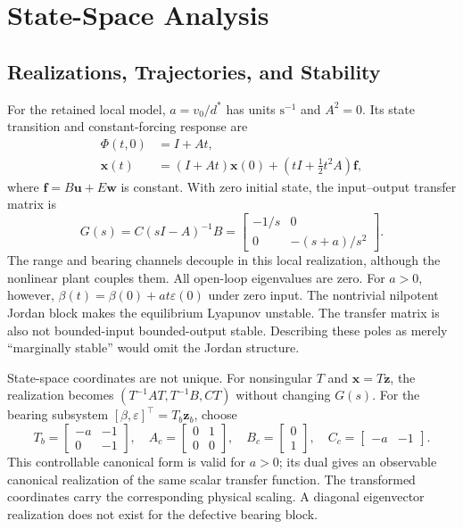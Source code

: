 \section{State-Space Analysis}
\label{sec:analysis}
\subsection{Realizations, Trajectories, and Stability}
For the retained local model, $a=v_0/d^\ast$ has units $\mathrm{s^{-1}}$ and $A^2=0$. Its state transition and constant-forcing response are
\begin{equation}
\begin{aligned}
\Phi(t,0)&=I+At,\\
\mathbf x(t)&=(I+At)\mathbf x(0)+\left(tI+\tfrac12t^2A\right)\mathbf f,
\end{aligned}
\label{eq:forced}
\end{equation}
where $\mathbf f=B\mathbf u+E\mathbf w$ is constant. With zero initial state, the input--output transfer matrix is
\begin{equation}
G(s)=C(sI-A)^{-1}B=
\begin{bmatrix}-1/s&0\\0&-(s+a)/s^2\end{bmatrix}.
\end{equation}
The range and bearing channels decouple in this local realization, although the nonlinear plant couples them. All open-loop eigenvalues are zero. For $a>0$, however, $\beta(t)=\beta(0)+at\varepsilon(0)$ under zero input. The nontrivial nilpotent Jordan block makes the equilibrium Lyapunov unstable. The transfer matrix is also not bounded-input bounded-output stable. Describing these poles as merely ``marginally stable'' would omit the Jordan structure.

State-space coordinates are not unique. For nonsingular $T$ and $\mathbf x=T\mathbf z$, the realization becomes $(T^{-1}AT,T^{-1}B,CT)$ without changing $G(s)$. For the bearing subsystem $[\beta,\varepsilon]^\top=T_b\mathbf z_b$, choose
\begin{equation}
T_b=\begin{bmatrix}-a&-1\\0&-1\end{bmatrix},\quad
A_c=\begin{bmatrix}0&1\\0&0\end{bmatrix},\quad
B_c=\begin{bmatrix}0\\1\end{bmatrix},\quad C_c=\begin{bmatrix}-a&-1\end{bmatrix}.
\end{equation}
This controllable canonical form is valid for $a>0$; its dual gives an observable canonical realization of the same scalar transfer function. The transformed coordinates carry the corresponding physical scaling. A diagonal eigenvector realization does not exist for the defective bearing block.

